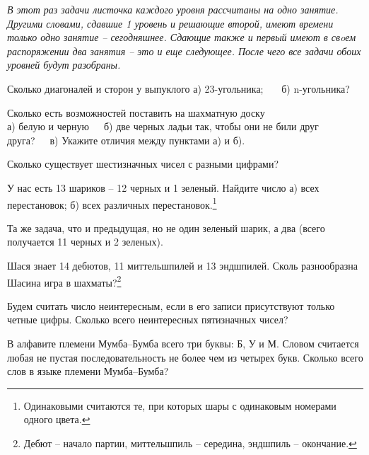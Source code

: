 
\textit{В этот раз задачи листочка каждого уровня  рассчитаны на одно занятие. Другими словами, сдавшие 1 уровень и решающие второй, имеют времени только одно занятие – сегодняшнее. Сдающие также и первый имеют в свoем распоряжении два занятия – это и еще следующее. После чего все задачи обоих уровней будут разобраны.}

\begin{thm}
	Сколько диагоналей и сторон у выпуклого  а) 23-угольника;~~~ б) n-угольника?
\end{thm}

\begin{thm}
	Сколько есть возможностей поставить на шахматную доску\\ а) белую и черную~~~б) две черных ладьи так, чтобы они не били друг друга?~~~в) Укажите отличия между пунктами а) и б).
\end{thm}

\begin{thm}
	Сколько существует шестизначных чисел с разными цифрами?
\end{thm}

\begin{thm}
	У нас есть 13 шариков – 12 черных и 1 зеленый. Найдите число а) всех перестановок; б) всех различных перестановок.\footnote{Одинаковыми считаются те, при которых шары с одинаковым номерами одного цвета.}
\end{thm}

\begin{thm}
	Та же задача, что и предыдущая, но не один зеленый шарик, а два (всего получается 11 черных и 2 зеленых).
\end{thm}

\begin{thm}
	Шася знает 14 дебютов, 11 миттельшпилей и 13 эндшпилей. Сколь разнообразна Шасина игра в шахматы?\footnote{Дебют – начало партии, миттельшпиль – середина, эндшпиль – окончание.}
\end{thm}



\begin{thm}	
	Будем считать число неинтересным, если в его записи присутствуют только четные цифры. Сколько всего неинтересных пятизначных чисел?
\end{thm}

\begin{thm}	
	В алфавите племени Мумба–Бумба всего три буквы: Б, У и М. Словом считается любая не пустая последовательность не более чем из четырех букв. Сколько всего слов в языке племени Мумба–Бумба?
\end{thm}

